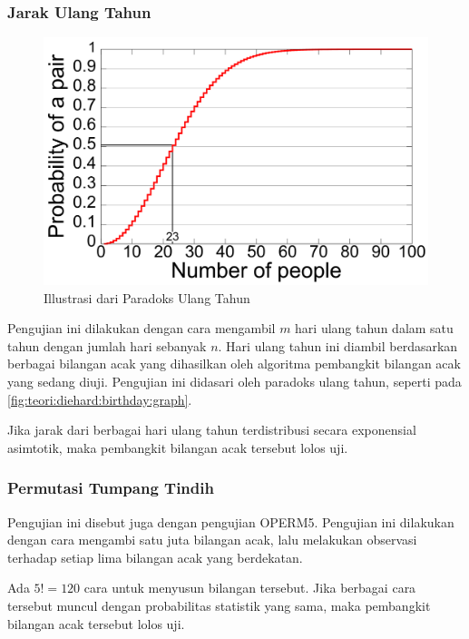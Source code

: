 \documentclass[conference]{IEEEtran}
\begin{document}
\subsubsection{Jarak Ulang Tahun}
\label{sec:teori:diehard:birthday}

\begin{figure}[htbp]
    \includegraphics[width=\linewidth]{img/teori-diehard-birthday-graph.png}
    \caption{Illustrasi dari Paradoks Ulang Tahun}
    \label{fig:teori:diehard:birthday:graph}
\end{figure}

Pengujian ini dilakukan dengan cara mengambil $m$ hari ulang tahun dalam satu tahun dengan jumlah hari sebanyak $n$.
Hari ulang tahun ini diambil berdasarkan berbagai bilangan acak yang dihasilkan oleh algoritma pembangkit bilangan acak yang sedang diuji.
Pengujian ini didasari oleh paradoks ulang tahun, seperti pada \autoref{fig:teori:diehard:birthday:graph}.

Jika jarak dari berbagai hari ulang tahun terdistribusi secara exponensial asimtotik, maka pembangkit bilangan acak tersebut lolos uji.

\subsubsection{Permutasi Tumpang Tindih}

Pengujian ini disebut juga dengan pengujian OPERM5.
Pengujian ini dilakukan dengan cara mengambi satu juta bilangan acak, lalu melakukan observasi terhadap setiap lima bilangan acak yang berdekatan.

Ada $5! = 120$ cara untuk menyusun bilangan tersebut.
Jika berbagai cara tersebut muncul dengan probabilitas statistik yang sama, maka pembangkit bilangan acak tersebut lolos uji.
\end{document}
